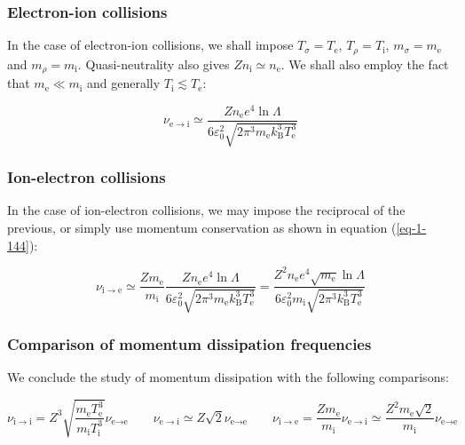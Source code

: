 \subsubsection{Electron-ion collisions}

In the case of electron-ion collisions, we shall impose $T_\sigma=T_\text{e}$, $T_\rho=T_\mathrm{i}$, $m_\sigma=m_\text{e}$ and $m_\rho=m_\mathrm{i}$. Quasi-neutrality also gives $Zn_\mathrm{i}\simeq n_\text{e}$. We shall also employ the fact that $m_\text{e}\ll m_\mathrm{i}$ and generally $T_\mathrm{i}\lesssim T_\text{e}$:

\begin{equation}
    \nu_{\text{e}\to\mathrm{i}}\simeq\frac{Zn_\text{e}e^4\ln{\Lambda}}{6\varepsilon_0^2\sqrt{2\pi^3m_\text{e}k_\mathrm{B}^3T_\text{e}^3}}
\end{equation}

\subsubsection{Ion-electron collisions}

In the case of ion-electron collisions, we may impose the reciprocal of the previous, or simply use momentum conservation as shown in equation (\ref{eq-1-144}):

\begin{equation}
    \nu_{\mathrm{i}\to\text{e}}\simeq\frac{Zm_\text{e}}{m_\mathrm{i}}\frac{Zn_\text{e}e^4\ln{\Lambda}}{6\varepsilon_0^2\sqrt{2\pi^3m_\text{e}k_\mathrm{B}^3T_\text{e}^3}}=\frac{Z^2n_\text{e}e^4\sqrt{m_\text{e}}\ln{\Lambda}}{6\varepsilon_0^2m_\mathrm{i}\sqrt{2\pi^3k_\mathrm{B}^3T_\text{e}^3}}
\end{equation}

\subsubsection{Comparison of momentum dissipation frequencies}

We conclude the study of momentum dissipation with the following comparisons:

\begin{equation}
    \nu_{\mathrm{i}\to\mathrm{i}}=Z^3\sqrt{\frac{m_\text{e}T_\text{e}^3}{m_\mathrm{i}T_\mathrm{i}^3}}\nu_{\text{e}\to\text{e}}\qquad\nu_{\text{e}\to\mathrm{i}}\simeq Z\sqrt{2}\nu_{\text{e}\to\text{e}}\qquad\nu_{\mathrm{i}\to\text{e}}=\frac{Zm_\text{e}}{m_\mathrm{i}}\nu_{\text{e}\to\mathrm{i}}\simeq\frac{Z^2m_\text{e}\sqrt{2}}{m_\mathrm{i}}\nu_{\text{e}\to\text{e}}
\end{equation}

